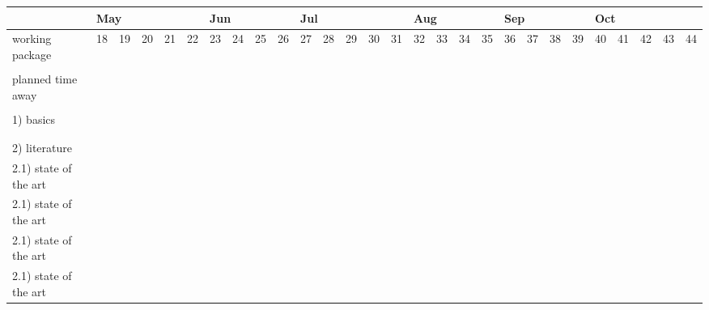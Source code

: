     \scriptsize
    \setlength{\tabcolsep}{7pt}
    \begin{longtable}{|X|c|c|c|c|c|c|c|c|c|c|c|c|c|c|c|c|c|c|c|c|c|c|c|c|c|c|c|}
        \cline{2-28} \multicolumn{1}{X|}{} & \multicolumn{5}{l|}{May} & \multicolumn{4}{l|}{Jun} & \multicolumn{5}{l|}{Jul} & \multicolumn{4}{l|}{Aug} & \multicolumn{4}{l|}{Sep} & \multicolumn{5}{l|}{Oct} \\ %
        \hline \rowcolor{middle-green!50} working package & 18 & 19 & 20 & 21 & 22 & 23 & 24 & 25 & 26 & 27 & 28 & 29 & 30 & 31 & 32 & 33 & 34 & 35 & 36 & 37 & 38 & 39 & 40 & 41 & 42 & 43 & 44 \\ \hline
        \multicolumn{27}{X}{} \\[-3.5ex] \hline
        \rowcolor{lightgray!50} planned time away & & & & \multicolumn{2}{l|}{\cellcolor{Maroon!80}} & & & & & & & & & & & & & & & & \cellcolor{Maroon!80} & & & & & &\\ \hline
        \multicolumn{27}{X}{} \\[-1.5ex] \endhead

        \hline \rowcolor{lightgray!50}1) basics & \cellcolor{dark-green!80} & & & & & & & & & & & & & & & & & & & & & & & & & &\\ \hline
        & & \multicolumn{3}{l|}{\cellcolor{light-green!80}} & & & & & & & & & & & & & & & & & & & & & & & \\ \hline

        \multicolumn{27}{X}{} \\[-3.5ex] \hline
        \rowcolor{lightgray!50} 2) literature & & & & \cellcolor{dark-green!80} & \cellcolor{dark-green!80} & & & & & & & & & & & & & & & & & & & & & &\\ \hline
        2.1) state of the art & & & & & & \cellcolor{light-green!80} & & & & & & & & & & & & & & & & & & & & &\\ \hline
        2.1) state of the art & & & & & & \cellcolor{light-green!80} & & & & & & & & & & & & & & & & & & & & &\\ \hline
        2.1) state of the art & & & & & & \cellcolor{light-green!80} & & & & & & & & & & & & & & & & & & & & &\\ \hline
        2.1) state of the art & & & & & & \cellcolor{light-green!80} & & & & & & & & & & & & & & & & & & & & &\\ \hline


\end{longtable}
